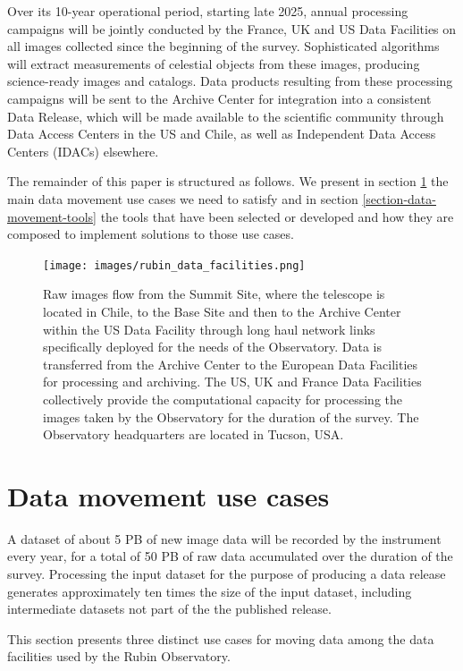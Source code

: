 \documentclass{webofc}
\begin{document}
Over its 10-year operational period, starting late 2025, annual processing campaigns will be jointly conducted by the France, UK and US Data Facilities on all images collected since the beginning of the survey. Sophisticated algorithms will extract measurements of celestial objects from these images, producing science-ready images and catalogs. Data products resulting from these processing campaigns will be sent to the Archive Center for integration into a consistent Data Release, which will be made available to the scientific community through Data Access Centers in the US and Chile, as well as Independent Data Access Centers (IDACs) elsewhere.

The remainder of this paper is structured as follows. We present in section \ref{section-data-movement-use-cases} the main data movement use cases we need to satisfy and in section \ref{section-data-movement-tools} the tools that have been selected or developed and how they are composed to implement solutions to those use cases.

\begin{figure}[h]
\texttt{[image: images/rubin\_data\_facilities.png]}
\caption{Raw images flow from the Summit Site, where the telescope is located in Chile, to the Base Site and then to the Archive Center within the US Data Facility through long haul network links specifically deployed for the needs of the Observatory. Data is transferred from the Archive Center to the European Data Facilities for processing and archiving. The US, UK and France Data Facilities collectively provide the computational capacity for processing the images taken by the Observatory for the duration of the survey. The Observatory headquarters are located in Tucson, USA.}
\label{fig:data-facilities}
\end{figure}

\section{Data movement use cases}
\label{section-data-movement-use-cases}

A dataset of about 5 PB of new image data will be recorded by the instrument every year, for a total of 50 PB of raw data accumulated over the duration of the survey. Processing the input dataset for the purpose of producing a data release generates approximately ten times the size of the input dataset, including intermediate datasets not part of the the published release.

This section presents three distinct use cases for moving data among the data facilities used by the Rubin Observatory.
\end{document}
